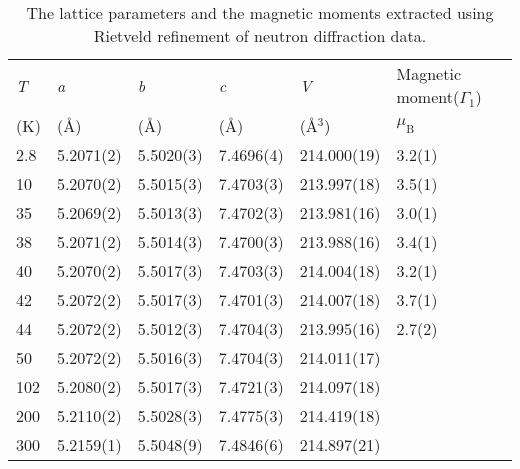 \documentclass[12pt,twocolumns]{iopart}
\begin{document}
\begin{center}
	\begin{table}[!b]
		\setlength{\tabcolsep}{10pt}
		\caption{The lattice parameters and the magnetic moments extracted using Rietveld refinement of neutron diffraction data. 
			\label{tab:abc}
			}
		\centering
		\begin{tabular}{llllll}   \hline
		 \textit{T}	         &      \textit{a}             &    \textit{b}       &    \textit{c}           &    \textit{V}        &  Magnetic moment($\Gamma_1$)       \\ 
		 (K)          &   (\AA{})          &  (\AA{})   &  (\AA{})       &  (\AA{}$^3$) &  $\mu_\mathrm{B}$                  \\
			\hline\hline
		2.8 & 5.2071(2) & 5.5020(3) & 7.4696(4) & 214.000(19) & 3.2(1) \\
		10  & 5.2070(2) & 5.5015(3) & 7.4703(3) & 213.997(18) &3.5(1)\\
		35  & 5.2069(2) & 5.5013(3) & 7.4702(3) & 213.981(16) &3.0(1)\\
		38  & 5.2071(2) & 5.5014(3) & 7.4700(3) & 213.988(16) &3.4(1)\\
		40  & 5.2070(2) & 5.5017(3) & 7.4703(3) & 214.004(18) &3.2(1)\\
		42  & 5.2072(2) & 5.5017(3) & 7.4701(3) & 214.007(18) &3.7(1)\\
		44  & 5.2072(2) & 5.5012(3) & 7.4704(3) & 213.995(16) &2.7(2)\\
		50  & 5.2072(2) & 5.5016(3) & 7.4704(3) & 214.011(17)                     
		                                        &\\
		102 & 5.2080(2) & 5.5017(3) & 7.4721(3) & 214.097(18) &\\
		200 & 5.2110(2) & 5.5028(3) & 7.4775(3) & 214.419(18) &\\
		300 & 5.2159(1) & 5.5048(9) & 7.4846(6) & 214.897(21) &\\    
 
		 \hline\hline
		\end{tabular}
	\end{table}
\end{center}
\clearpage\newpage
\end{document}
